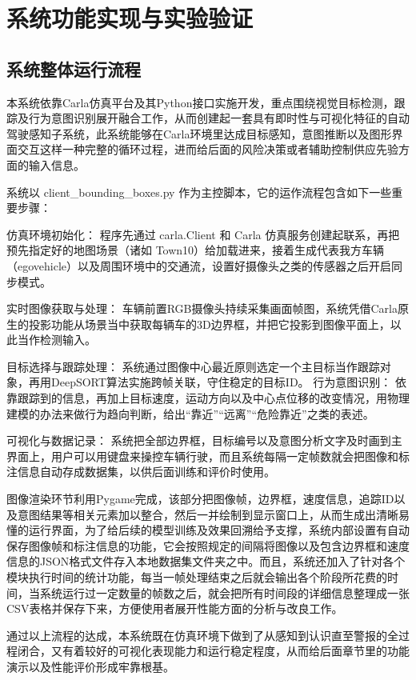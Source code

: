 \chapter{系统功能实现与实验验证}

\section{系统整体运行流程}

本系统依靠Carla仿真平台及其Python接口实施开发，重点围绕视觉目标检测，跟踪及行为意图识别展开融合工作，从而创建起一套具有即时性与可视化特征的自动驾驶感知子系统，此系统能够在Carla环境里达成目标感知，意图推断以及图形界面交互这样一种完整的循环过程，进而给后面的风险决策或者辅助控制供应先验方面的输入信息。

系统以 client\_bounding\_boxes.py 作为主控脚本，它的运作流程包含如下一些重要步骤：

仿真环境初始化： 程序先通过 carla.Client 和 Carla 仿真服务创建起联系，再把预先指定好的地图场景（诸如 Town10）给加载进来，接着生成代表我方车辆（egovehicle）以及周围环境中的交通流，设置好摄像头之类的传感器之后开启同步模式。

实时图像获取与处理： 车辆前置RGB摄像头持续采集画面帧图，系统凭借Carla原生的投影功能从场景当中获取每辆车的3D边界框，并把它投影到图像平面上，以此当作检测输入。

目标选择与跟踪处理： 系统通过图像中心最近原则选定一个主目标当作跟踪对象，再用DeepSORT算法实施跨帧关联，守住稳定的目标ID。
行为意图识别： 依靠跟踪到的信息，再加上目标速度，运动方向以及中心点位移的改变情况，用物理建模的办法来做行为趋向判断，给出“靠近”“远离”“危险靠近”之类的表述。

可视化与数据记录： 系统把全部边界框，目标编号以及意图分析文字及时画到主界面上，用户可以用键盘来操控车辆行驶，而且系统每隔一定帧数就会把图像和标注信息自动存成数据集，以供后面训练和评价时使用。

图像渲染环节利用Pygame完成，该部分把图像帧，边界框，速度信息，追踪ID以及意图结果等相关元素加以整合，然后一并绘制到显示窗口上，从而生成出清晰易懂的运行界面，为了给后续的模型训练及效果回溯给予支撑，系统内部设置有自动保存图像帧和标注信息的功能，它会按照规定的间隔将图像以及包含边界框和速度信息的JSON格式文件存入本地数据集文件夹之中。而且，系统还加入了针对各个模块执行时间的统计功能，每当一帧处理结束之后就会输出各个阶段所花费的时间，当系统运行过一定数量的帧数之后，就会把所有时间段的详细信息整理成一张CSV表格并保存下来，方便使用者展开性能方面的分析与改良工作。

通过以上流程的达成，本系统既在仿真环境下做到了从感知到认识直至警报的全过程闭合，又有着较好的可视化表现能力和运行稳定程度，从而给后面章节里的功能演示以及性能评价形成牢靠根基。

